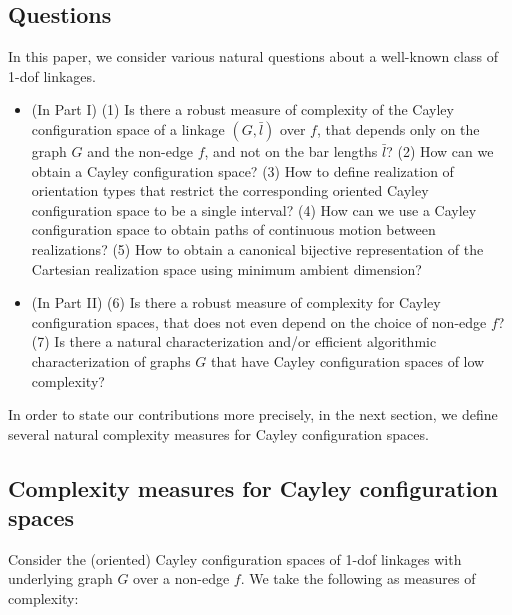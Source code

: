 \documentclass[secthm,amsthm,english]{article}
\theoremstyle{definition}
\theoremstyle{remark}
\begin{document}
\subsection{Questions}
\label{subsec:questions}

In this paper, we consider various natural questions about a well-known class of 1-dof linkages.

\begin{itemize}

	\item (In Part I)
	(1) Is there a robust measure of complexity of the Cayley configuration space of a linkage $(G,\bar{l})$ over $f$,
	 that depends only on the graph $G$ and the non-edge $f$, and not on the bar lengths $\bar{l}$? 	
	(2) How can we obtain a Cayley configuration space? 
	(3) How to define realization of orientation types 
	that restrict the corresponding oriented Cayley configuration space to be a single interval?
(4) How can we use a Cayley configuration space to obtain paths of continuous motion between realizations? 
	(5) How to obtain a canonical bijective representation of the Cartesian realization space using minimum ambient dimension?
	
	\item (In Part II) 
	(6) Is there a robust measure of complexity for Cayley configuration spaces,
	that does not even depend on the choice of non-edge $f$?
	(7) Is there a natural characterization and/or efficient algorithmic characterization 
	of graphs $G$ that have Cayley configuration spaces of low complexity?

\end{itemize}

\noindent In order to state our contributions more precisely, in the next section, we define several natural complexity measures for Cayley configuration spaces.
\subsection{Complexity measures for Cayley configuration spaces}


Consider the (oriented) Cayley configuration spaces of 1-dof linkages with underlying graph $G$ over a non-edge $f$. 
We take the following as measures of complexity:
\end{document}
